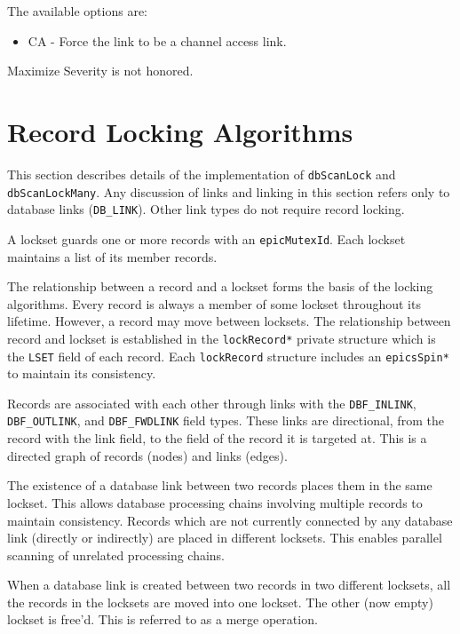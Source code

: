 The available options are:

\begin{itemize}

\item CA - Force the link to be a channel access link.

\end{itemize}

Maximize Severity is not honored.


\section{Record Locking Algorithms}
\label{chap:locking algo}

This section describes details of the implementation of \verb|dbScanLock| and \verb|dbScanLockMany|.
Any discussion of links and linking in this section refers only to database links (\verb|DB_LINK|).
Other link types do not require record locking.

A lockset guards one or more records with an \verb|epicMutexId|.
Each lockset maintains a list of its member records.

The relationship between a record and a lockset forms the basis of the locking algorithms.
Every record is always a member of some lockset throughout its lifetime.
However, a record may move between locksets.
The relationship between record and lockset is established in the \verb|lockRecord*| private structure which is the \verb|LSET| field of each record.
Each \verb|lockRecord| structure includes an \verb|epicsSpin*| to maintain its consistency.

Records are associated with each other through links with the \verb|DBF_INLINK|, \verb|DBF_OUTLINK|, and \verb|DBF_FWDLINK| field types.
These links are directional, from the record with the link field, to the field of the record it is targeted at.
This is a directed graph of records (nodes) and links (edges).

The existence of a database link between two records places them in the same lockset.
This allows database processing chains involving multiple records to maintain consistency.
Records which are not currently connected by any database link (directly or indirectly) are placed in different locksets.
This enables parallel scanning of unrelated processing chains.

When a database link is created between two records in two different locksets,
all the records in the locksets are moved into one lockset.
The other (now empty) lockset is free'd.
This is referred to as a merge operation.

